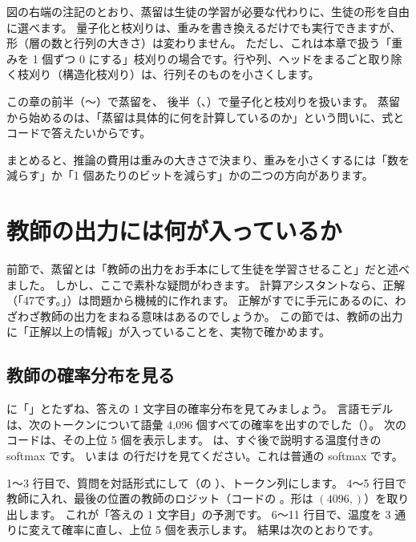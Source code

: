 図の右端の注記のとおり、蒸留は生徒の学習が必要な代わりに、生徒の形を自由に選べます。
量子化と枝刈りは、重みを書き換えるだけでも実行できますが、形（層の数と行列の大きさ）は変わりません。
ただし、これは本章で扱う「重みを 1 個ずつ 0 にする」枝刈りの場合です。行や列、ヘッドをまるごと取り除く枝刈り（構造化枝刈り）は、行列そのものを小さくします。

この章の前半（〜）で蒸留を、
後半（、）で量子化と枝刈りを扱います。
蒸留から始めるのは、「蒸留は具体的に何を計算しているのか」という問いに、式とコードで答えたいからです。

まとめると、推論の費用は重みの大きさで決まり、重みを小さくするには「数を減らす」か「1 個あたりのビットを減らす」かの二つの方向があります。

\section{教師の出力には何が入っているか}\label{sec:distill-dark}

前節で、蒸留とは「教師の出力をお手本にして生徒を学習させること」だと述べました。
しかし、ここで素朴な疑問がわきます。
計算アシスタントなら、正解（「47です。」）は問題から機械的に作れます。
正解がすでに手元にあるのに、わざわざ教師の出力をまねる意味はあるのでしょうか。
この節では、教師の出力に「正解以上の情報」が入っていることを、実物で確かめます。

\subsection{教師の確率分布を見る}

 に「」とたずね、答えの 1 文字目の確率分布を見てみましょう。
言語モデルは、次のトークンについて語彙 4,096 個すべての確率を出すのでした（）。
次のコードは、その上位 5 個を表示します。
 は、すぐ後で説明する温度付きの softmax です。
いまは  の行だけを見てください。これは普通の softmax です。


1〜3 行目で、質問を対話形式にして（の ）、トークン列にします。
4〜5 行目で教師に入れ、最後の位置の教師のロジット（コードの 。形は $(4096,)$）を取り出します。
これが「答えの 1 文字目」の予測です。
6〜11 行目で、温度を 3 通りに変えて確率に直し、上位 5 個を表示します。
結果は次のとおりです。

